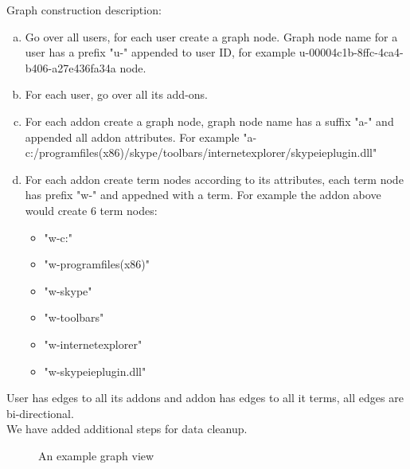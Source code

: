 \documentclass[11pt,oneside]{book}
\begin{document}
\begin{description}
\item Graph construction description:
\end{description}
\begin{enumerate}[(a)]
\item Go over all users, for each user create a graph node. Graph node name for a user has a prefix "u-" appended to user ID, for example u-00004c1b-8ffc-4ca4-b406-a27e436fa34a node.

\item For each user, go over all its add-ons.
\item For each addon create a graph node, graph node name has a suffix "a-" and appended all addon attributes. For example "a-c:/programfiles(x86)/skype/toolbars/internetexplorer/skypeieplugin.dll"
\item For each addon create term nodes according to its attributes, each term node has prefix "w-" and appedned with a term. For example the addon above would create 6 term nodes:

\begin{itemize}
\renewcommand{\labelitemi}{$\bullet$} 
\item "w-c:"
\item "w-programfiles(x86)"
\item "w-skype"
\item "w-toolbars"
\item "w-internetexplorer"
\item "w-skypeieplugin.dll"
\end{itemize}
\end{enumerate}
User has edges to all its addons and addon has edges to all it terms, all edges are bi-directional.\\
We have added additional steps for data cleanup.
\begin{figure}
    \centering 
    \caption{An example graph view}
    \label{fig:sample_graph}
  \end{figure}
\end{document}
